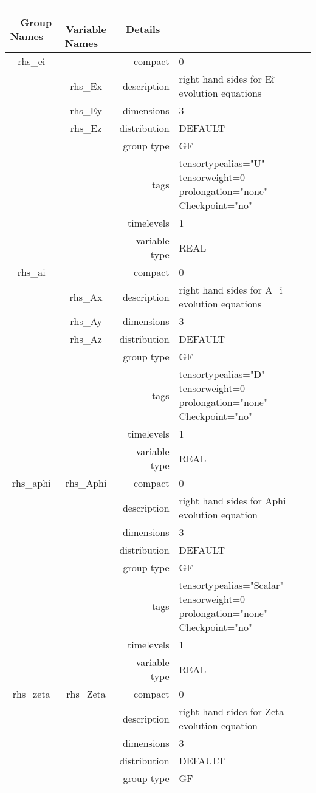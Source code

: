 \begin{tabular*}{150mm}{|c|c@{\extracolsep{\fill}}|rl|} \hline 
~ {\bf Group Names} ~ & ~ {\bf Variable Names} ~  &{\bf Details} ~ & ~\\ 
\hline 
rhs\_ei &  & compact & 0 \\ 
 & rhs\_Ex & description & right hand sides for E\^i evolution equations \\ 
 & rhs\_Ey & dimensions & 3 \\ 
 & rhs\_Ez & distribution & DEFAULT \\ 
 &  & group type & GF \\ 
 &  & tags & tensortypealias="U" tensorweight=0 prolongation="none" Checkpoint="no" \\ 
 &  & timelevels & 1 \\ 
 &  & variable type & REAL \\ 
\hline 
rhs\_ai &  & compact & 0 \\ 
 & rhs\_Ax & description & right hand sides for A\_i evolution equations \\ 
 & rhs\_Ay & dimensions & 3 \\ 
 & rhs\_Az & distribution & DEFAULT \\ 
 &  & group type & GF \\ 
 &  & tags & tensortypealias="D" tensorweight=0 prolongation="none" Checkpoint="no" \\ 
 &  & timelevels & 1 \\ 
 &  & variable type & REAL \\ 
\hline 
rhs\_aphi & rhs\_Aphi & compact & 0 \\ 
 &  & description & right hand sides for Aphi evolution equation \\ 
 &  & dimensions & 3 \\ 
 &  & distribution & DEFAULT \\ 
 &  & group type & GF \\ 
 &  & tags & tensortypealias="Scalar" tensorweight=0 prolongation="none" Checkpoint="no" \\ 
 &  & timelevels & 1 \\ 
 &  & variable type & REAL \\ 
\hline 
rhs\_zeta & rhs\_Zeta & compact & 0 \\ 
 &  & description & right hand sides for Zeta evolution equation \\ 
 &  & dimensions & 3 \\ 
 &  & distribution & DEFAULT \\ 
 &  & group type & GF \\ 

\end{tabular*}
